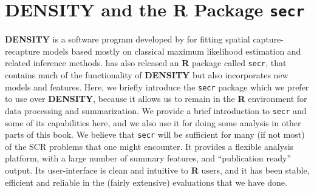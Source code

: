 \begin{comment}
\subsection{
Exercises
}

{\flushleft
1.	Compute the 95\% confidence interval for wolverine density,
somehow. Comment on the practical implication of this level of precision.
}

{\flushleft
2.	Compute the AIC of this model and modify \mbox{\tt intlik3}
 to consider alternative link functions (at least one additional) and
 compare the  AIC of the different models and the estimates. Comment. 
}
\end{comment}


\section{DENSITY and the R Package \mbox{\tt secr} }
\label{mle.sec.secr}

{\bf DENSITY} is a software program developed by \citet{efford:2004}
for fitting spatial capture-recapture models based mostly on classical
maximum likelihood estimation and related inference methods.
\citet{efford:2011} has also released an {\bf R} package called
\mbox{\tt secr}, that contains much of the functionality of {\bf
  DENSITY} but also incorporates new models and features.  Here, we
briefly introduce the \mbox{\tt secr} package which we prefer to use
over {\bf DENSITY}, because it allows us to remain in the {\bf R}
environment for data processing and summarization. We provide a brief
introduction to \mbox{\tt secr} and some of its capabilities here, and
we also use it for doing some analysis in other parts of this book. We
believe that \mbox{\tt secr} will be sufficient for many (if not most) 
of the SCR problems that one might encounter. It 
provides a flexible analysis platform, with a large number of summary
features, and ``publication ready'' output. Its user-interface is
clean and intuitive to {\bf R} users, and it has been stable,
efficient and reliable in the (fairly extensive) evaluations that we
have done. 


